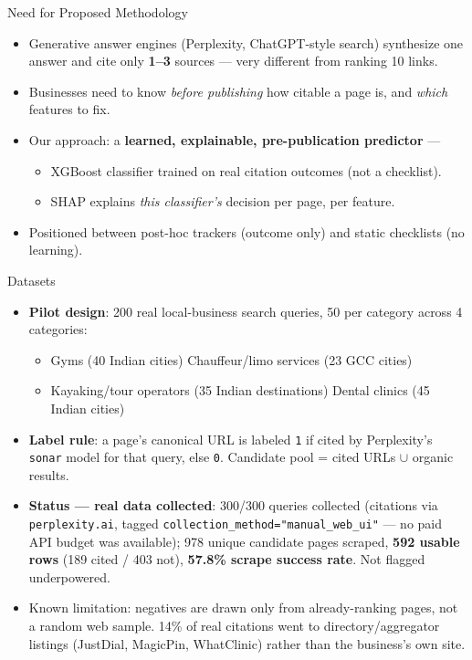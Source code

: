 \documentclass[aspectratio=169]{beamer}
\begin{document}
\begin{frame}{Need for Proposed Methodology}
  \begin{itemize}
    \item Generative answer engines (Perplexity, ChatGPT-style search) synthesize one answer and cite only \textbf{1--3} sources — very different from ranking 10 links.
    \item Businesses need to know \emph{before publishing} how citable a page is, and \emph{which} features to fix.
    \item Our approach: a \textbf{learned, explainable, pre-publication predictor} —
    \begin{itemize}
      \item XGBoost classifier trained on real citation outcomes (not a checklist).
      \item SHAP explains \emph{this classifier's} decision per page, per feature.
    \end{itemize}
    \item Positioned between post-hoc trackers (outcome only) and static checklists (no learning).
  \end{itemize}
\end{frame}

\begin{frame}{Datasets}
  \begin{itemize}
    \item \textbf{Pilot design}: 200 real local-business search queries, 50 per category across 4 categories:
    \begin{itemize}
      \item Gyms (40 Indian cities) \quad\textbullet\quad Chauffeur/limo services (23 GCC cities)
      \item Kayaking/tour operators (35 Indian destinations) \quad\textbullet\quad Dental clinics (45 Indian cities)
    \end{itemize}
    \item \textbf{Label rule}: a page's canonical URL is labeled \texttt{1} if cited by Perplexity's \texttt{sonar} model for that query, else \texttt{0}. Candidate pool = cited URLs $\cup$ organic results.
    \item \textbf{Status — real data collected}: 300/300 queries collected (citations via \texttt{perplexity.ai}, tagged \texttt{collection\_method="manual\_web\_ui"} — no paid API budget was available); 978 unique candidate pages scraped, \textbf{592 usable rows} (189 cited / 403 not), \textbf{57.8\% scrape success rate}. Not flagged underpowered.
    \item Known limitation: negatives are drawn only from already-ranking pages, not a random web sample. 14\% of real citations went to directory/aggregator listings (JustDial, MagicPin, WhatClinic) rather than the business's own site.
  \end{itemize}
\end{frame}
\end{document}
